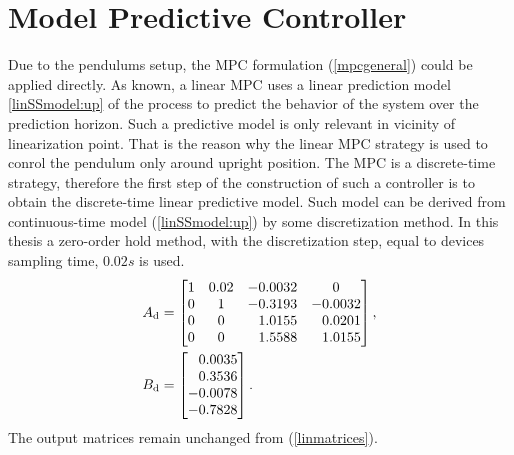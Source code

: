 \section{Model Predictive Controller}
Due to the pendulums setup, the MPC formulation (\ref{mpcgeneral}) could be applied directly. As known, a linear MPC uses a linear prediction model \ref{linSSmodel:up} of the process to predict the behavior of the system over the prediction horizon. Such a predictive model is only relevant in vicinity of linearization point. That is the reason why the linear MPC strategy is used to conrol the pendulum only around upright position. 
The MPC is a discrete-time strategy, therefore the first step of the construction of such a controller is to obtain the discrete-time linear predictive model. Such model can be derived from continuous-time model (\ref{linSSmodel:up}) by some discretization method. In this thesis a zero-order hold method, with the discretization step, equal to devices sampling time, $0.02 s$ is used. 
\begin{subequations}\label{dismatrices}
	\begin{align}
	A _{\text{d}} &=\begin{bmatrix}
	1&0.02&-0.0032& 0\\
	0&1&-0.3193&-0.0032\\
	0&0&\ \; \,1.0155&\ \; \,0.0201\\
	0&0&\ \; \,1.5588&\ \; \,1.0155
	\end{bmatrix},\\
	B _{\text{d}} &=\begin{bmatrix}
	\ \; \,0.0035\\
	\ \; \,0.3536\\
	-0.0078\\
	-0.7828
	\end{bmatrix}.\\
	\end{align}
\end{subequations}
The output matrices remain unchanged from (\ref{linmatrices}).\\ 

